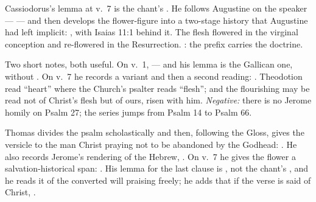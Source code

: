 \begin{witnessnote}
Cassiodorus's lemma at v.~7 is the chant's . He follows
Augustine on the speaker ---  --- and then develops the flower-figure into a two-stage history
that Augustine had left implicit: , with Isaias 11:1 behind it. The flesh flowered in the
virginal conception and re-flowered in the Resurrection. : the prefix carries the doctrine.
\end{witnessnote}

\begin{witnessnote}
Two short notes, both useful. On v.~1,  --- and
his lemma is the Gallican one, without . On v.~7 he records
a variant and then a second reading: . Theodotion read
``heart'' where the Church's psalter reads ``flesh''; and the flourishing may
be read not of Christ's flesh but of ours, risen with him. \textit{Negative:}
there is no Jerome homily on Psalm 27; the  series jumps from
Psalm 14 to Psalm 66.
\end{witnessnote}

\begin{witnessnote}
Thomas divides the psalm scholastically and then, following the Gloss, gives
the versicle to the man Christ praying not to be abandoned by the Godhead:
. He also records Jerome's rendering of the
Hebrew, . On v.~7 he gives the flower a
salvation-historical span: . His lemma for the last clause is , not
the chant's , and he reads it of the converted will praising
freely; he adds that if the verse is said of Christ, .
\end{witnessnote}

